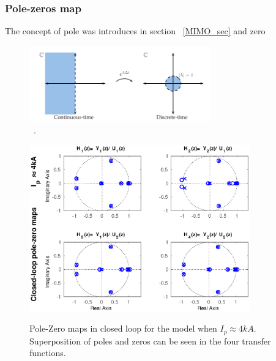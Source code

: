 \subsubsection{Pole-zeros map}

The concept of pole was introduces in section ~\ref{MIMO_sec} and zero 


\begin{figure}
	\centering
	\includegraphics[width=0.7\textwidth]{Chp5/PolesZerosMaps.png}
	
	\caption{~\cite[Chapter~8]{DataDriven2019}\label{PoleZeroMap}.}
\end{figure}

\begin{figure}
	\centering
	\includegraphics[width=0.85\textwidth]{Chp5/PoleZero/PoleZeroClosePos.eps}
	\label{PoleZeroClosePos}
	\caption{Pole-Zero maps in closed loop for the model when $I_p\approx 4 kA$. Superposition  of poles and zeros can be seen in the four transfer functions.}
\end{figure}	

